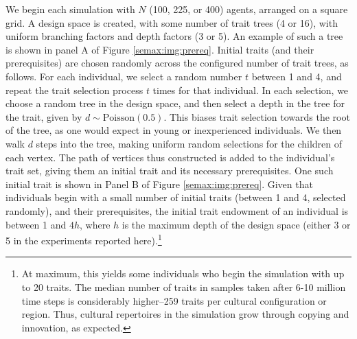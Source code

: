 We begin each simulation with $N$ (100, 225, or 400) agents, arranged on
a square grid. A design space is created, with some number of trait
trees (4 or 16), with uniform branching factors and depth factors (3 or
5). An example of such a tree is shown in panel A of Figure
\ref{semax:img:prereq}. Initial traits (and their prerequisites) are chosen
randomly across the configured number of trait trees, as follows. For
each individual, we select a random number $t$ between 1 and 4, and
repeat the trait selection process $t$ times for that individual. In
each selection, we choose a random tree in the design space, and then
select a depth in the tree for the trait, given by
$d  \sim \textrm{Poisson}(0.5)$. This biases trait selection towards the
root of the tree, as one would expect in young or inexperienced
individuals. We then walk $d$ steps into the tree, making uniform random
selections for the children of each vertex. The path of vertices thus
constructed is added to the individual's trait set, giving them an
initial trait and its necessary prerequisites. One such initial trait is
shown in Panel B of Figure \ref{semax:img:prereq}. Given that individuals
begin with a small number of initial traits (between 1 and 4, selected
randomly), and their prerequisites, the initial trait endowment of an
individual is between 1 and $4h$, where $h$ is the maximum depth of the
design space (either 3 or 5 in the experiments reported here).\footnote{At
  maximum, this yields some individuals who begin the simulation with up
  to 20 traits. The median number of traits in samples taken after 6-10
  million time steps is considerably higher--259 traits per cultural
  configuration or region. Thus, cultural repertoires in the simulation
  grow through copying and innovation, as expected.}

